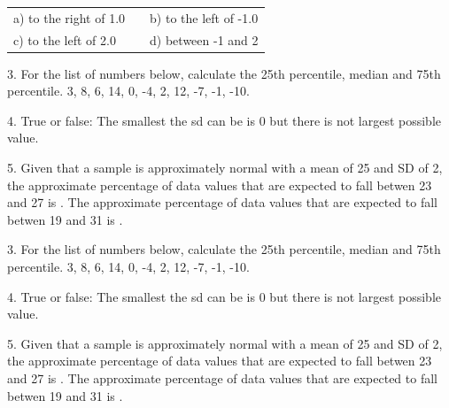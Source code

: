 \documentclass[10pt]{article}
\begin{document}
\begin{center}
\begin{tabular}{lcl}
a) to the right of 1.0  &\hspace{2in} & b) to the left of -1.0\\[1in]
c) to the left of 2.0   &             & d) between -1 and 2
\end{tabular}
\end{center}
\eject

3. For the list of numbers below, calculate the 25th percentile, median and 75th percentile.
3, 8, 6, 14, 0, -4, 2, 12, -7, -1, -10.
\vspace{1.25in}

4. True or false:  The smallest the sd can be is 0 but there is not largest possible value.

\vspace{1in}

5. Given that a sample is approximately normal with a mean of 25 and SD of 2, the approximate
percentage of data values that are expected to fall betwen 23 and 27 is 
\underline{\hspace{1in}}.
The approximate
percentage of data values that are expected to fall betwen 19 and 31 is 
\underline{\hspace{1in}}.

\vfill
3. For the list of numbers below, calculate the 25th percentile, median and 75th percentile.
3, 8, 6, 14, 0, -4, 2, 12, -7, -1, -10.
\vspace{1.25in}


4. True or false:  The smallest the sd can be is 0 but there is not largest possible value.
\vspace{1in}

5. Given that a sample is approximately normal with a mean of 25 and SD of 2, the approximate
percentage of data values that are expected to fall betwen 23 and 27 is 
\underline{\hspace{1in}}.
The approximate
percentage of data values that are expected to fall betwen 19 and 31 is 
\underline{\hspace{1in}}.
\vspace{1in}
\end{document}
